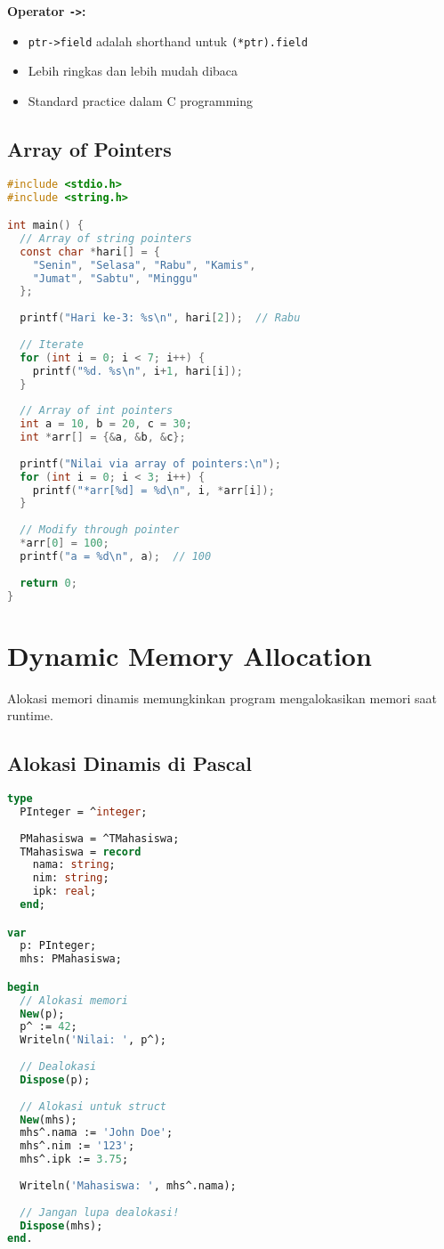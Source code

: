 \documentclass[../main.tex]{subfiles}
\begin{document}
\textbf{Operator \texttt{->}:}
\begin{itemize}
  \item \texttt{ptr->field} adalah shorthand untuk \texttt{(*ptr).field}
  \item Lebih ringkas dan lebih mudah dibaca
  \item Standard practice dalam C programming
\end{itemize}

\subsection{Array of Pointers}

\begin{lstlisting}[language=C, caption={Array of pointers di C}]
#include <stdio.h>
#include <string.h>

int main() {
  // Array of string pointers
  const char *hari[] = {
    "Senin", "Selasa", "Rabu", "Kamis",
    "Jumat", "Sabtu", "Minggu"
  };
  
  printf("Hari ke-3: %s\n", hari[2]);  // Rabu
  
  // Iterate
  for (int i = 0; i < 7; i++) {
    printf("%d. %s\n", i+1, hari[i]);
  }
  
  // Array of int pointers
  int a = 10, b = 20, c = 30;
  int *arr[] = {&a, &b, &c};
  
  printf("Nilai via array of pointers:\n");
  for (int i = 0; i < 3; i++) {
    printf("*arr[%d] = %d\n", i, *arr[i]);
  }
  
  // Modify through pointer
  *arr[0] = 100;
  printf("a = %d\n", a);  // 100
  
  return 0;
}
\end{lstlisting}

\section{Dynamic Memory Allocation}

Alokasi memori dinamis memungkinkan program mengalokasikan memori saat runtime.

\subsection{Alokasi Dinamis di Pascal}

\begin{lstlisting}[language=Pascal, caption={New dan Dispose di Pascal}]
type
  PInteger = ^integer;
  
  PMahasiswa = ^TMahasiswa;
  TMahasiswa = record
    nama: string;
    nim: string;
    ipk: real;
  end;

var
  p: PInteger;
  mhs: PMahasiswa;

begin
  // Alokasi memori
  New(p);
  p^ := 42;
  Writeln('Nilai: ', p^);
  
  // Dealokasi
  Dispose(p);
  
  // Alokasi untuk struct
  New(mhs);
  mhs^.nama := 'John Doe';
  mhs^.nim := '123';
  mhs^.ipk := 3.75;
  
  Writeln('Mahasiswa: ', mhs^.nama);
  
  // Jangan lupa dealokasi!
  Dispose(mhs);
end.
\end{lstlisting}
\end{document}
